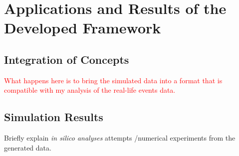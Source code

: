 \section{Applications and Results of the Developed Framework}

\subsection{Integration of Concepts}
\textcolor{red}{What happens here is to bring the simulated data into a format that is compatible with my analysis of the real-life events data.}


\subsection{Simulation Results}
{\color{red} 
	
	Briefly explain \emph{in silico analyses} attempts /numerical experiments from the generated data.
	
}









